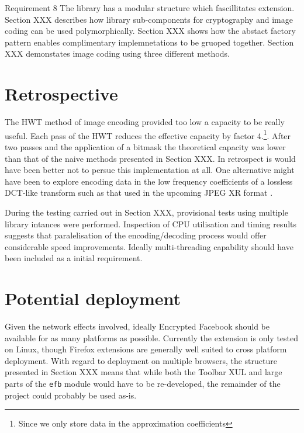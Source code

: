 \begin{desc}
    \item[Requirement 8] The library has a modular structure which fascillitates extension. Section XXX describes how library sub-components for cryptography and image coding can be used polymorphically. Section XXX shows how the abstact factory pattern enables complimentary implemnetations to be gruoped together. Section XXX demonstates image coding using three different methods.

\end{desc}


\section{Retrospective}
\label{sec:retro}

The HWT method of image encoding provided too low a capacity to be really useful. Each pass of the HWT reduces the effective capacity by factor 4.\footnote{Since we only store data in the approximation coefficients}. After two passes and the application of a bitmask the theoretical capacity was lower than that of the naive methods presented in Section XXX. In retrospect is would have been better not to persue this implementation at all. One alternative might have been to explore encoding data in the low frequency coefficients of a lossless DCT-like transform such as that used in the upcoming JPEG XR format \cite{jpegxr}.

During the testing carried out in Section XXX, provisional tests using multiple library intances were performed. Inspection of CPU utilisation and timing results suggests that paralelisation of the encoding/decoding process would offer considerable speed improvements. Ideally multi-threading capability should have been included as a initial requirement.


\section{Potential deployment}
\label{sec:deploy}

Given the network effects involved, ideally Encrypted Facebook should be available for as many platforms as possible. Currently the extension is only tested on Linux, though Firefox extensions are generally well suited to cross platform deployment. With regard to deployment on multiple browsers, the structure presented in Section XXX means that while both the Toolbar XUL and large parts of the {\tt efb} module would have to be re-developed, the remainder of the project could probably be used as-is.

